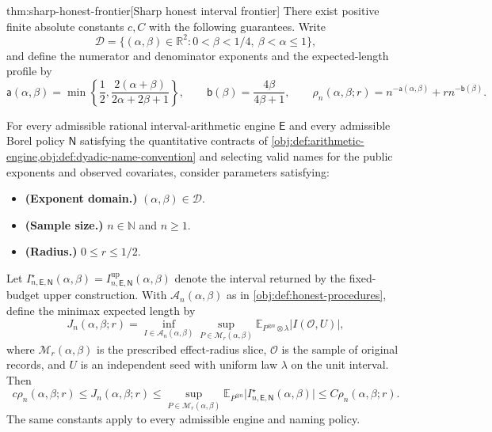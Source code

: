 \begin{theoremv}{thm:sharp-honest-frontier}[Sharp honest interval frontier]
There exist positive finite absolute constants \(c,C\) with the following guarantees. Write
\[
\mathcal D=\{(\alpha,\beta)\in\mathbb R^2:0<\beta<1/4,\ \beta<\alpha\le1\},
\]
and define the numerator and denominator exponents and the expected-length profile by
\[
\mathsf a(\alpha,\beta)
=\min\left\{\frac12,\frac{2(\alpha+\beta)}{2\alpha+2\beta+1}\right\},
\qquad
\mathsf b(\beta)=\frac{4\beta}{4\beta+1},
\qquad
\rho_n(\alpha,\beta;r)
=n^{-\mathsf a(\alpha,\beta)}+r n^{-\mathsf b(\beta)}.
\]

For every admissible rational interval-arithmetic engine \(\mathsf E\) and every admissible Borel policy \(\mathsf N\) satisfying the quantitative contracts of \cref{obj:def:arithmetic-engine,obj:def:dyadic-name-convention} and selecting valid names for the public exponents and observed covariates, consider parameters satisfying:
\begin{itemize}
\item \textbf{(Exponent domain.)} \((\alpha,\beta)\in\mathcal D\).
\item \textbf{(Sample size.)} \(n\in\mathbb N\) and \(n\ge1\).
\item \textbf{(Radius.)} \(0\le r\le1/2\).
\end{itemize}
Let \(I^\star_{n,\mathsf E,\mathsf N}(\alpha,\beta)
=I^{\mathrm{up}}_{n,\mathsf E,\mathsf N}(\alpha,\beta)\) denote the interval returned by the fixed-budget upper construction. With \(\mathcal A_n(\alpha,\beta)\) as in \cref{obj:def:honest-procedures}, define the minimax expected length by
\[
J_n(\alpha,\beta;r)
=
\inf_{I\in\mathcal A_n(\alpha,\beta)}
\sup_{P\in\mathcal M_r(\alpha,\beta)}
\mathbb E_{P^{\otimes n}\otimes\lambda}
\bigl|I(\mathcal O,U)\bigr|,
\]
where \(\mathcal M_r(\alpha,\beta)\) is the prescribed effect-radius slice, \(\mathcal O\) is the sample of original records, and \(U\) is an independent seed with uniform law \(\lambda\) on the unit interval. Then
\[
c\rho_n(\alpha,\beta;r)
\le J_n(\alpha,\beta;r)
\le
\sup_{P\in\mathcal M_r(\alpha,\beta)}
\mathbb E_{P^{\otimes n}}
\bigl|I^\star_{n,\mathsf E,\mathsf N}(\alpha,\beta)\bigr|
\le C\rho_n(\alpha,\beta;r).
\]
The same constants apply to every admissible engine and naming policy.


\end{theoremv}
